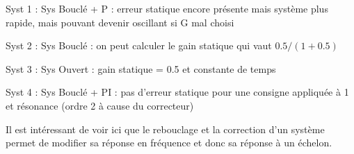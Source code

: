 \documentclass[a4paper,french]{paper}
\begin{document}

Syst 1 : Sys Bouclé + P : erreur statique encore présente mais système plus rapide, mais pouvant devenir oscillant si G mal choisi

	Syst 2 : Sys Bouclé : on peut calculer le gain statique qui vaut $0.5/(1+0.5)$

	Syst 3 : Sys Ouvert : gain statique = 0.5 et constante de temps

	Syst 4 : Sys Bouclé + PI : pas d'erreur statique pour une consigne appliquée à 1 et résonance (ordre 2 à cause du correcteur)
	
	Il est intéressant de voir ici que le rebouclage et la correction d'un système permet de modifier sa réponse en fréquence et donc sa réponse à un échelon.
\end{document}
